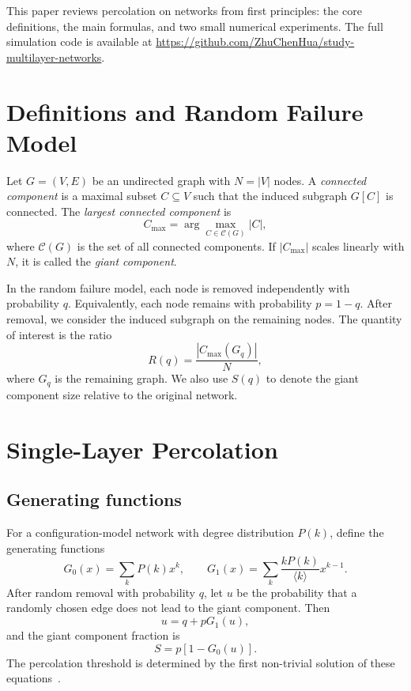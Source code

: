 \documentclass[11pt]{article}
\begin{document}
This paper reviews percolation on networks from first principles: the core definitions, the main formulas, and two small numerical experiments. The full simulation code is available at \url{https://github.com/ZhuChenHua/study-multilayer-networks}.

\section{Definitions and Random Failure Model}
Let $G=(V,E)$ be an undirected graph with $N=|V|$ nodes. A \emph{connected component} is a maximal subset $C\subseteq V$ such that the induced subgraph $G[C]$ is connected. The \emph{largest connected component} is
\begin{equation}
  C_{\max} = \arg\max_{C\in \mathcal{C}(G)} |C|,
\end{equation}
where $\mathcal{C}(G)$ is the set of all connected components. If $|C_{\max}|$ scales linearly with $N$, it is called the \emph{giant component}.

In the random failure model, each node is removed independently with probability $q$. Equivalently, each node remains with probability $p=1-q$. After removal, we consider the induced subgraph on the remaining nodes. The quantity of interest is the ratio
\begin{equation}
  R(q) = \frac{|C_{\max}(G_q)|}{N},
\end{equation}
where $G_q$ is the remaining graph. We also use $S(q)$ to denote the giant component size relative to the original network.

\section{Single-Layer Percolation}
\subsection{Generating functions}
For a configuration-model network with degree distribution $P(k)$, define the generating functions
\begin{equation}
  G_0(x)=\sum_k P(k)x^k,\qquad
  G_1(x)=\sum_k \frac{kP(k)}{\langle k\rangle}x^{k-1}.
\end{equation}
After random removal with probability $q$, let $u$ be the probability that a randomly chosen edge does not lead to the giant component. Then
\begin{equation}
  u = q + p G_1(u),
\end{equation}
and the giant component fraction is
\begin{equation}
  S = p[1-G_0(u)].
\end{equation}
The percolation threshold is determined by the first non-trivial solution of these equations~\cite{newman2010}.
\end{document}
